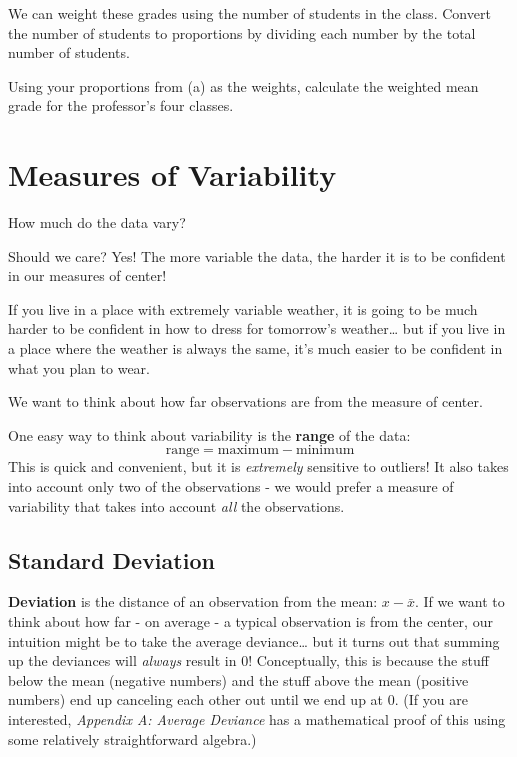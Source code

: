 \documentclass[
]{book}
\begin{document}
We can weight these grades using the number of students in the class. Convert the number of students to proportions by dividing each number by the total number of students.

Using your proportions from (a) as the weights, calculate the weighted mean grade for the professor's four classes.

\section{Measures of Variability}\label{measures-of-variability}

How much do the data vary?

Should we care? Yes! The more variable the data, the harder it is to be confident in our measures of center!

If you live in a place with extremely variable weather, it is going to be much harder to be confident in how to dress for tomorrow's weather\ldots{} but if you live in a place where the weather is always the same, it's much easier to be confident in what you plan to wear.

We want to think about how far observations are from the measure of center.

One easy way to think about variability is the \textbf{range} of the data: \[\text{range} = \text{maximum} - \text{minimum}\] This is quick and convenient, but it is \emph{extremely} sensitive to outliers! It also takes into account only two of the observations - we would prefer a measure of variability that takes into account \emph{all} the observations.

\subsection{Standard Deviation}\label{standard-deviation}

\textbf{Deviation} is the distance of an observation from the mean: \(x - \bar{x}\). If we want to think about how far - on average - a typical observation is from the center, our intuition might be to take the average deviance\ldots{} but it turns out that summing up the deviances will \emph{always} result in 0! Conceptually, this is because the stuff below the mean (negative numbers) and the stuff above the mean (positive numbers) end up canceling each other out until we end up at 0. (If you are interested, \emph{Appendix A: Average Deviance} has a mathematical proof of this using some relatively straightforward algebra.)
\end{document}
